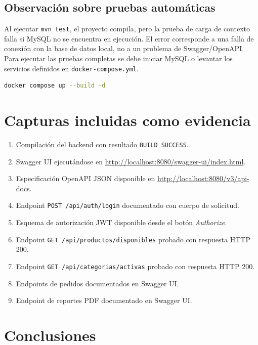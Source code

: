 \documentclass[10pt,a4paper]{article}
\newcommand{\cod}[1]{\texttt{\scriptsize #1}}
\begin{document}
\subsection{Observación sobre pruebas automáticas}

Al ejecutar \cod{mvn test}, el proyecto compila, pero la prueba de carga de contexto falla si MySQL no se encuentra en ejecución. El error corresponde a una falla de conexión con la base de datos local, no a un problema de Swagger/OpenAPI. Para ejecutar las pruebas completas se debe iniciar MySQL o levantar los servicios definidos en \cod{docker-compose.yml}.

\begin{lstlisting}[language=bash,caption={Comando sugerido para iniciar servicios con Docker.}]
docker compose up --build -d
\end{lstlisting}

\section{Capturas incluidas como evidencia}

\begin{enumerate}
    \item Compilación del backend con resultado \cod{BUILD SUCCESS}.
    \item Swagger UI ejecutándose en \url{http://localhost:8080/swagger-ui/index.html}.
    \item Especificación OpenAPI JSON disponible en \url{http://localhost:8080/v3/api-docs}.
    \item Endpoint \cod{POST /api/auth/login} documentado con cuerpo de solicitud.
    \item Esquema de autorización JWT disponible desde el botón \textit{Authorize}.
    \item Endpoint \cod{GET /api/productos/disponibles} probado con respuesta HTTP 200.
    \item Endpoint \cod{GET /api/categorias/activas} probado con respuesta HTTP 200.
    \item Endpoints de pedidos documentados en Swagger UI.
    \item Endpoint de reportes PDF documentado en Swagger UI.
\end{enumerate}

\section{Conclusiones}
\end{document}
